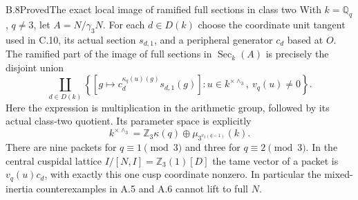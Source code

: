 \begin{statement}{B.8}{Proved}{The exact local image of ramified full sections in class two}
With $k=\mathbb Q_q$, $q\ne3$, let $A=N/\gamma_3N$.
For each $d\in D(k)$ choose the coordinate unit tangent
used in C.10, its actual section $s_{d,1}$, and a peripheral
generator $c_d$ based at $O$.  The ramified part of the image
of full sections in $\operatorname{Sec}_k(A)$ is precisely
the disjoint union
\[
 \coprod_{d\in D(k)}
 \left\{
  \left[g\longmapsto
    c_d^{\kappa_q(u)(g)}s_{d,1}(g)\right]:
  u\in k^{\times\wedge_3},\ v_q(u)\ne0
 \right\}.                                                   \tag{B.8.1}
\]
Here the expression is multiplication in the arithmetic
group, followed by its actual class-two quotient.
Its parameter space is explicitly
\[
 k^{\times\wedge_3}
   =\mathbb Z_3\kappa(q)\oplus\mu_{3^{v_3(q-1)}}(k).
                                                               \tag{B.8.2}
\]
There are nine packets for $q\equiv1\pmod3$ and three for
$q\equiv2\pmod3$.  In the central cuspidal lattice
$I/[N,I]=\mathbb Z_3(1)[D]$ the tame vector of a packet is
$v_q(u)c_d$, with exactly this one cusp coordinate nonzero.
In particular the mixed-inertia counterexamples in A.5 and
A.6 cannot lift to full $N$.
\end{statement}
